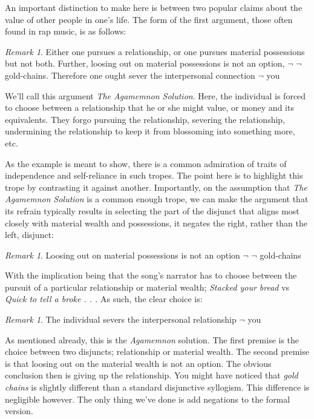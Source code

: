 \documentclass[12pt]{book}
\theoremstyle{definition}
\theoremstyle{remark}
\newtheorem{remark}[theorem]{Remark}
\begin{document}
An important distinction to make here is between two popular claims about the value of other people in one's life. The form of the first argument, those often found in rap music, is as follows:

\begin{remark}
Either one pursues a relationship, or one pursues material possessions but not both. Further, loosing out on material possessions is not an option, \(\lnot\) \(\lnot\) gold-chains. Therefore one ought sever the interpersonal connection \(\lnot\) you
\end{remark}

We'll call this argument \emph{The Agamemnon Solution}. Here, the individual is forced to choose between a relationship that he or she might value, or money and its equivalents. They forgo pursuing the relationship, severing the relationship, undermining the relationship to keep it from blossoming into something more, etc.

As the example is meant to show, there is a common admiration of traits of independence and self-reliance in such tropes. The point here is to highlight this trope by contrasting it against another. Importantly, on the assumption that \emph{The Agamemnon Solution} is a common enough trope, we can make the argument that its refrain typically results in selecting the part of the disjunct that aligns most closely with material wealth and possessions, it negates the right, rather than the left, disjunct:

\begin{remark}
Loosing out on material possessions is not an option \(\lnot\) \(\lnot\) gold-chains
\end{remark}

With the implication being that the song's narrator has to choose between the pursuit of a particular relationship or material wealth; \emph{Stacked your bread} vs \emph{Quick to tell a broke . . .} As such, the clear choice is:

\begin{remark}
The individual severs the interpersonal relationship \(\lnot\) you
\end{remark}

As mentioned already, this is the \emph{Agamemnon} solution. The first premise is the choice between two disjuncts; relationship or material wealth. The second premise is that loosing out on the material wealth is not an option. The obvious conclusion then is giving up the relationship. You might have noticed that \emph{gold chains} is slightly different than a standard disjunctive syllogism. This difference is negligible however. The only thing we've done is add negations to the formal version.
\end{document}
